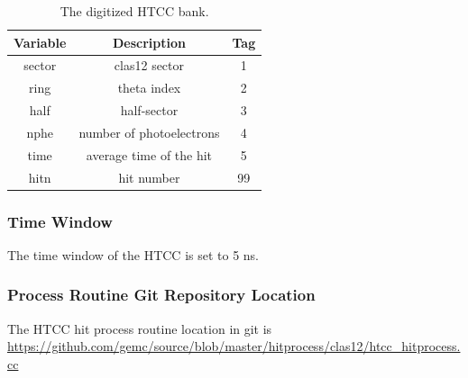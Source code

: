 \begin{table}[h]
	\begin{center}
		\begin{tabular}{| c | c | c |}
			\hline \hline
			Variable         & Description  & Tag  \\
			\hline
             sector &                                     clas12 sector  &    1   \\
             ring   &                                       theta index  &    2   \\
             half   &                                       half-sector  &    3   \\
             nphe   &                          number of photoelectrons  &    4   \\
             time   &                           average time of the hit  &    5   \\
             hitn   &                                        hit number  &   99   \\
			\hline \hline
		\end{tabular}
	\end{center}
	\caption{The digitized HTCC bank.}\label{tab:htccBank}
\end{table}

\subsubsection{Time Window}
The time window  of the HTCC is set to 5 ns.

\subsubsection{Process Routine Git Repository Location}
The HTCC hit process routine location in git is \url{https://github.com/gemc/source/blob/master/hitprocess/clas12/htcc_hitprocess.cc}
